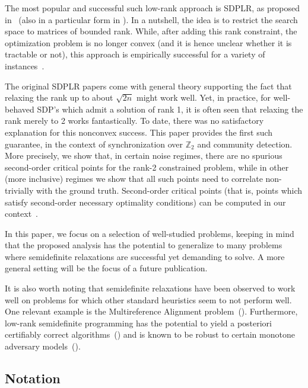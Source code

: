 \documentclass{colt2016} %
\newcommand{\1}{\mathbf{1}}
\newcommand{\ZZ}{\mathbb{Z}}
\begin{document}
The most popular and successful such low-rank approach is SDPLR, as proposed in~\citep{sdplr,burer2005local} (also in a particular form in \citep{burer2002rank}). In a nutshell, the idea is to restrict the search space to matrices of bounded rank. While, after adding this rank constraint, the optimization problem is no longer convex (and it is hence unclear whether it is tractable or not),
this approach is empirically successful for a variety of instances~\citep{sdplr,journee2010low,bandeira2014tightness,boumal2015staircase}.

The original SDPLR papers come with general theory supporting the fact that relaxing the rank up to about $\sqrt{2n}$ might work well. Yet, in practice, for well-behaved SDP's which admit a solution of rank 1, it is often seen that relaxing the rank merely to 2 works fantastically. To date, there was no satisfactory explanation for this nonconvex success. This paper provides the first such guarantee, in the context of synchronization over $\ZZ_2$ and community detection. More precisely, we show that, in certain noise regimes, there are no spurious second-order critical points for the
rank-2 constrained problem, while in other (more inclusive) regimes we show that all such points need to correlate non-trivially with the ground truth. Second-order critical points (that is, points which satisfy second-order necessary optimality conditions) can be computed in our context~\citep{boumal2016complexity}.

In this paper, we focus on a selection of well-studied problems, keeping in mind that the proposed analysis has the potential to generalize to many problems where semidefinite relaxations are successful yet demanding to solve. A more general setting will be the focus of a future publication.

It is also worth noting that semidefinite relaxations have been observed to work well on problems for which other standard heuristics seem to not perform well. One relevant example is the Multireference Alignment problem~(\cite{Bandeira_Charikar_Singer_Zhu_Alignment}). Furthermore, low-rank semidefinite programming has the potential to yield a posteriori certifiably correct algorithms~(\cite{Bandeira_PCC}) and is known to be robust to certain monotone adversary models~(\cite{Feige_Kilian_bisection_01,Moitra_SBMadversary}).



\subsection*{Notation}
\end{document}
